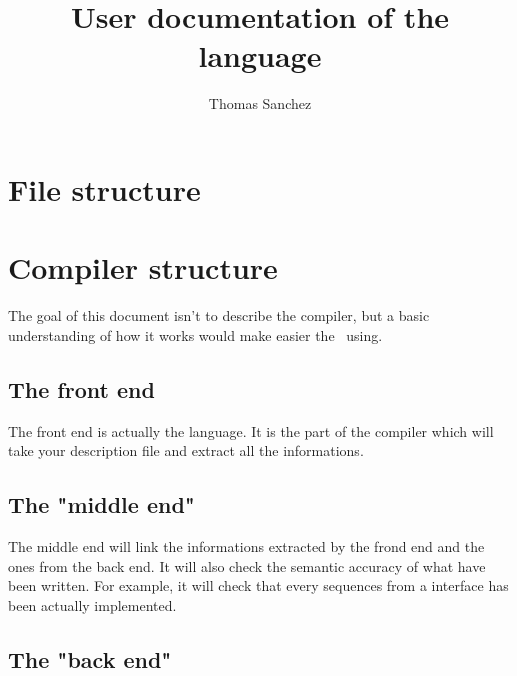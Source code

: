 \documentclass[american]{rtxreport}
\author{Thomas Sanchez}
\title{User documentation of the language}
\begin{document}
\maketitle

\rtxmaketitleblock

\tableofcontents


\lstset{language=rathaxes}

\chapter{File structure}


\chapter{Compiler structure}


The goal of this document isn't to describe the compiler, but a basic understanding of how it works would
make easier the \rtx\ using.


\section{The front end}

The front end is actually the language. It is the part of the compiler which will take your description file and
extract all the informations.


\section{The "middle end"}

The middle end will link the informations extracted by the frond end and the ones from the back end. It will
also check the semantic accuracy of what have been written. For example, it will check that every sequences from
a interface has been actually implemented.


\section{The "back end"}
\end{document}

